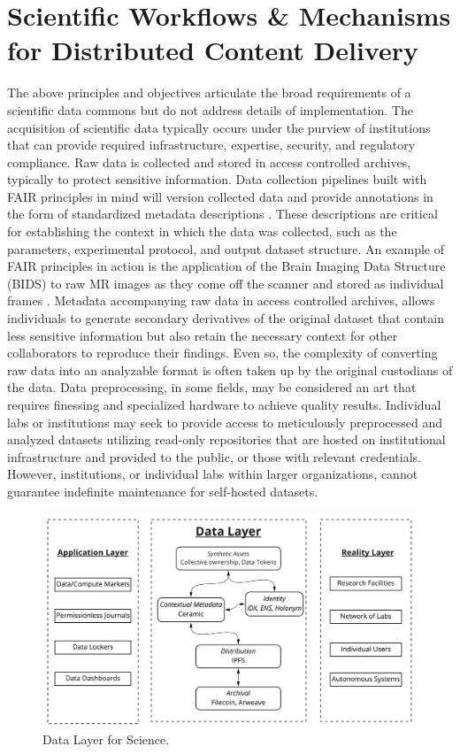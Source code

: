\documentclass[conference]{IEEEtran}
\begin{document}
\section{Scientific Workflows \& Mechanisms for Distributed Content Delivery}
The above principles and objectives articulate the broad requirements of a scientific data commons but do not address details of implementation. The acquisition of scientific data typically occurs under the purview of institutions that can provide required infrastructure, expertise, security, and regulatory compliance. Raw data is collected and stored in access controlled archives, typically to protect sensitive information. Data collection pipelines built with FAIR principles in mind will version collected data and provide annotations in the form of standardized metadata descriptions \cite{keator2019tools}. These descriptions are critical for establishing the context in which the data was collected, such as the parameters, experimental protocol, and output dataset structure. An example of FAIR principles in action is the application of the Brain Imaging Data Structure (BIDS) to raw MR images as they come off the scanner and stored as individual frames \cite{gorgolewski2016brain}. Metadata accompanying raw data in access controlled archives, allows individuals to generate secondary derivatives of the original dataset that contain less sensitive information but also retain the necessary context for other collaborators to reproduce their findings. Even so, the complexity of converting raw data into an analyzable format is often taken up by the original custodians of the data. Data preprocessing, in some fields, may be considered an art that requires finessing and specialized hardware to achieve quality results. Individual labs or institutions may seek to provide access to meticulously preprocessed and analyzed datasets utilizing read-only repositories that are hosted on institutional infrastructure and provided to the public, or those with relevant credentials. However, institutions, or individual labs within larger organizations, cannot guarantee indefinite maintenance for self-hosted datasets. 

\begin{figure}[htbp]
  \includegraphics[width=\textwidth]{data-layer.png}
  \caption{Data Layer for Science.}
\end{figure}
\end{document}
